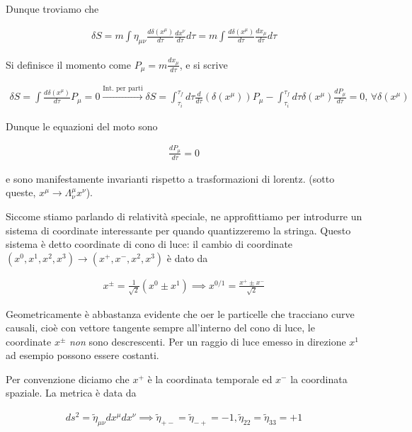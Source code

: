 \documentclass{report}
\begin{document}
Dunque troviamo che 

\begin{align}
    \delta S = m \int \eta_{\mu\nu}\frac{d\delta(x^\mu)}{d\tau}\frac{dx^\nu}{d\tau} d\tau = m \int \frac{d\delta(x^\mu)}{d\tau}\frac{dx_\mu}{d\tau}d\tau
\end{align}

Si definisce il momento come \(P_\mu = m\frac{dx_\mu}{d\tau}\), e si scrive 

\begin{align}
    \delta S = \int \frac{d\delta(x^\mu)}{d\tau} P_\mu = 0 \xrightarrow[]{\text{Int. per parti}} \delta S = \int_{\tau_i}^{\tau_f} d\tau \frac{d}{d\tau}(\delta(x^\mu))P_\mu - \int_{\tau_i}^{\tau_f} d\tau \delta(x^\mu)\frac{dP_\mu}{d\tau} = 0, \, \forall \delta(x^\mu)
\end{align}

Dunque le equazioni del moto sono 

\begin{align}
    \frac{dP_\mu}{d\tau} = 0 
\end{align}

e sono manifestamente invarianti rispetto a trasformazioni di lorentz. (sotto queste, \(x^\mu \rightarrow \Lambda^\mu_\nu x^\nu\)). 

Siccome stiamo parlando di relatività speciale, ne approfittiamo per introdurre un sistema di coordinate interessante per quando quantizzeremo la stringa. Questo sistema è detto coordinate di cono di luce: il cambio di coordinate \((x^0, x^1, x^2, x^3) \to (x^+, x^-, x^2, x^3)\) è dato da 

\begin{align}
    x^\pm = \frac{1}{\sqrt{2}}(x^0 \pm x^1) \implies x^{0 / 1} = \frac{x^+ \pm x^-}{\sqrt{2}}
\end{align}

Geometricamente è abbastanza evidente che oer le particelle che tracciano curve causali, cioè con vettore tangente sempre all'interno del cono di luce, le coordinate \(x^\pm\) \emph{non} sono descrescenti. Per un raggio di luce emesso in direzione \(x^1\) ad esempio possono essere costanti. 

Per convenzione diciamo che \(x^+\) è la coordinata temporale ed \(x^-\) la coordinata spaziale. La metrica è data da 

\begin{align}
    ds^2 = \tilde{\eta}_{\mu\nu}dx^\mu dx^\nu \implies \tilde{\eta}_{+-} = \tilde{\eta}_{-+} = -1, \tilde{\eta}_{22} = \tilde{\eta}_{33} = +1
\end{align}
\end{document}
